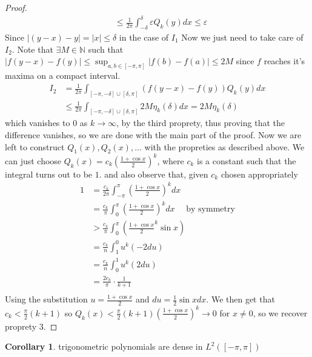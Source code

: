 \documentclass[13pt]{article}
\theoremstyle{definition} --- default
\newtheorem{corollary}[theorem]{Corollary}
\theoremstyle{definition}
\theoremstyle{remark}
\begin{document}
\begin{proof}
\begin{align*}
        &\leq \frac{1}{2\pi} \int_{-\delta}^\delta \varepsilon Q_k(y)dx \leq \varepsilon 
    \end{align*}
    Since $|(y-x) - y| = |x| \leq \delta$ in the case of $I_1$
    Now we just need to take care of $I_2$. Note that $\exists M \in \mathbb{N}$ such that  $|f(y-x) - f(y)| \leq \sup_{a,b \in [-\pi,\pi]} |f(b) - f(a)| \leq 2M$ since $f$ reaches it's maxima on a compact interval. 
    \begin{align*}
        I_2 &= \frac{1}{2\pi} \int_{[-\pi,-\delta]\cup[\delta,\pi]} (f(y-x) - f(y))Q_k(y)dx \\
        &\leq \frac{1}{2\pi} \int_{[-\pi,-\delta]\cup[\delta,\pi]} 2M \eta_k(\delta)dx = 2M\eta_k(\delta)
    \end{align*}
    which vanishes to $0$ as $k \to \infty$, by the third proprety, thus proving that the difference vanishes, so we are done with the main part of the proof. 
    Now we are left to construct $Q_1(x), Q_2(x),\ldots$ with the propreties as described above. 
   We can just choose $ \displaystyle Q_k(x) = c_k \left(\frac{1 + \cos x}{2} \right)^k $, where $c_k$ is a constant such that the integral turns out to be $1$. 
   and also observe that, given $c_k$ chosen appropriately
   \begin{align*}
     1 &= \frac{c_k}{2\pi} \int_{-\pi}^\pi \left( \frac{1 + \cos x}{2}\right)^kdx \\
     &= \frac{c_k}{\pi} \int_{0}^\pi \left( \frac{1+ \cos x}{2}\right)^k dx \quad \text{ by symmetry} \\
     &> \frac{c_k}{\pi} \int_{0}^\pi \left( \frac{1 + \cos x}{2}^k \sin x\right) \\
     &= \frac{c_k}{n} \int_{1}^0 u^k (-2du)\\
     &=\frac{c_k}{n} \int_{0}^1 u^k (2du) \\
     &= \frac{2 c_k}{\pi} \cdot \frac{1}{k+1}\\
   \end{align*}
   Using the substitution $u = \frac{1+\cos x}{2}$ and $du = \frac{1}{2} \sin x dx$. 
   We then get that $c_k < \frac{\pi}{2} (k+1)$
   so $Q_k(x) < \frac{\pi}{2} (k+1) \left(\frac{1 + \cos x}{2}\right)^k \to 0$ for $x \neq 0$, so we recover proprety 3. 




\end{proof}
\begin{corollary}
    trigonometric polynomials are dense in $L^2([-\pi,\pi])$

   \end{corollary} 
    
\end{document}

